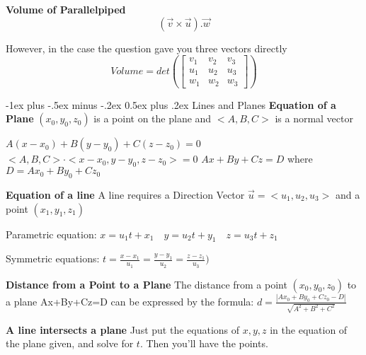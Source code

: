 \documentclass[10pt,a4paper,landscape]{article}
\makeatletter
\renewcommand{\subsection}{\@startsection{subsection}{2}{0mm}%
{-1ex plus -.5ex minus -.2ex}%
{0.5ex plus .2ex}%
{\normalfont\normalsize\bfseries}}
\makeatother
\begin{document}
\begin{multicols*}{5}
	\textbf{Volume of Parallelpiped} \newline 
	\begin{equation*}
		( \vec{ v } \times \vec{ u } ) . \vec{ w }
	\end{equation*}

	However, in the case the question gave you three vectors directly
	\begin{equation*}
		Volume = det \left( \left [
			\begin{matrix}
				v_1&v_2&v_3\\u_1&u_2&u_3\\w_1&w_2&w_3
			\end{matrix}
			\right]
		\right)
	\end{equation*}


	\subsection {Lines and Planes}
	\textbf{Equation of a Plane}\newline
	$ (x_0, y_0, z_0) $ is a point on the plane and $ <A,B,C> $ is a normal vector

	$A(x-x_0)+B(y-y_0)+C(z-z_0) = 0$\newline
	$ <A,B,C> \cdot <x-x_0, y-y_0, z-z_0> = 0 $\newline
	$ Ax+By+Cz = D $ where $ D=Ax_0+By_0+Cz_0 $\newline

	\textbf{Equation of a line}\newline
	A line requires a Direction Vector $ \vec{u}=<u_1,u_2,u_3> $ and a point $(x_1,y_1,z_1)$\newline

	Parametric equation: 
	$ x=u_1t+x_1 \quad y=u_2t+y_1 \quad z=u_3t+z_1 $

	Symmetric equations:
	$	t= \frac{ x-x_1 }{u_1} = \frac{ y-y_1 }{u_2} = \frac{ z-z_1 }{u_3}) $



	\textbf{Distance from a Point to a Plane}\newline
	The distance from a point $(x_0,y_0,z_0)$ to a plane Ax+By+Cz=D can be expressed by the formula:\newline
	$ d=\frac{|Ax_0+By_0+Cz_0-D|}{\sqrt{A^2+B^2+C^2}} $\newline

	\textbf{A line intersects a plane} Just put the equations of $x,y,z$ in the equation of the plane given, and solve for $t$. Then you'll have the points. 
	\newline 


\end{multicols*}
\end{document}
